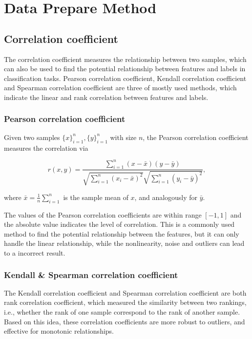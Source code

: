 \documentclass[11pt]{article}
\begin{document}
\section{Data Prepare Method}

\subsection{Correlation coefficient}

The correlation coefficient measures the relationship between two samples, which can also be used to find the potential relationship between features and labels in classification tasks. Pearson correlation coefficient, Kendall correlation coefficient and Spearman correlation coefficient are three of mostly used methods, which indicate the linear and rank correlation between features and labels.

\subsubsection{Pearson correlation coefficient}

Given two samples $\{x\}_{i=1}^n, \{y\}_{i=1}^n$ with size $n$, the Pearson correlation coefficient measures the correlation via

$$
  r (x, y) = \frac{\sum_{i=1}^n (x - \bar{x}) (y - \bar{y})}{\sqrt{\sum_{i=1}^n (x_i - \bar{x})^2} \sqrt{\sum_{i=1}^n (y_i - \bar{y})^2}},
$$

\noindent where $\bar{x} = \frac{1}{n} \sum_{i=1}^n$ is the sample mean of $x$, and analogously for $\bar{y}$.

The values of the Pearson correlation coefficients are within range $[-1, 1]$ and the absolute value indicates the level of correlation. This is a commonly used method to find the potential relationship between the features, but it can only handle the linear relationship, while the nonlinearity, noise and outliers can lead to a incorrect result.

\subsubsection{Kendall \& Spearman correlation coefficient}

The Kendall correlation coefficient and Spearman correlation coefficient are both rank correlation coefficient, which measured the similarity between two rankings, i.e., whether the rank of one sample correspond to the rank of another sample. Based on this idea, these correlation coefficients are more robust to outliers, and effective for monotonic relationships.
\end{document}

